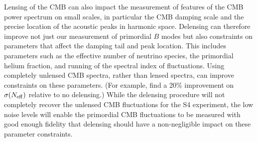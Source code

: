 Lensing of the CMB can also impact the measurement of features of the CMB power spectrum on small scales, in particular the CMB damping scale and the precise location of the acoustic peaks in harmonic space.  Delensing can therefore improve not just our measurement of primordial $B$ modes but also constraints on parameters that affect the damping tail and peak location.
This includes parameters such as the effective number of neutrino species,  the primordial helium fraction, and running of the spectral index of fluctuations.  Using completely unlensed CMB spectra, rather than lensed spectra, can improve constraints on these parameters. (For example, \cite{Baumann:2015rya} find a 20\% improvement on $\sigma(N_\mathrm{eff})$ relative to no delensing.)  While the delensing procedure will not completely recover the unlensed CMB fluctuations for the S4 experiment, the low noise levels will enable the primordial CMB fluctuations to be measured with good enough fidelity that delensing should have a non-negligible impact on these parameter constraints.
